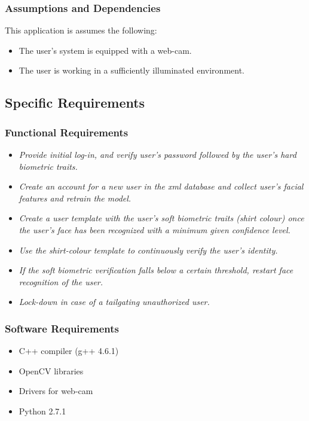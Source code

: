 \documentclass[12pt]{article}			%
\begin{document}
\subsubsection{ Assumptions and Dependencies }
This application is assumes the following:
\begin{itemize}
	\item The user's system is equipped with a web-cam.
	\item The user is working in a sufficiently illuminated environment.
\end{itemize}

\subsection{ Specific Requirements }
\subsubsection{ Functional Requirements }
\begin{itemize}
	\item{\it Provide initial log-in, and verify user's password followed by the user's hard biometric traits. }
	\item{\it Create an account for a new user in the xml database and collect user's facial features and retrain the model. }
	\item{\it Create a user template with the user's soft biometric traits (shirt colour) once the user's face has been recognized with a minimum given confidence level.  }
	\item{\it Use the shirt-colour template to continuously verify the user's identity.  }
	\item{\it If the soft biometric verification falls below a certain threshold, restart face recognition of the user.  }
	\item{\it Lock-down in case of a tailgating unauthorized user. }
\end{itemize}

\subsubsection{ Software Requirements }
\begin{itemize}
\item C++ compiler (g++ 4.6.1)
\item OpenCV libraries
\item Drivers for web-cam
\item Python 2.7.1
\end{itemize}
\end{document}
